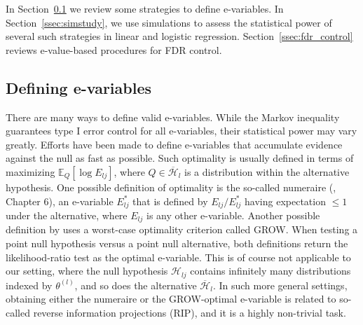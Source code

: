 \documentclass[pdflatex,sn-mathphys-num]{sn-jnl}%
\theoremstyle{thmstyleone}%
\theoremstyle{thmstyletwo}%
\theoremstyle{thmstylethree}%
\begin{document}
In Section~\ref{ssec:define_evariables} we review some strategies to define e-variables. 
In Section~\ref{ssec:simstudy}, we use simulations to assess the statistical power of several such strategies in linear and logistic regression. Section~\ref{ssec:fdr_control} reviews e-value-based procedures for FDR control.


\subsection{Defining e-variables}
\label{ssec:define_evariables}

There are many ways to define valid e-variables. While the Markov inequality guarantees type I error control for all e-variables, their statistical power may vary greatly. Efforts have been made to define e-variables that accumulate evidence against the null as fast as possible. Such optimality is usually defined in terms of maximizing $\mathbb E_Q [\log E_{lj}]$, where $Q \in \overline{\mathcal{H}}_l$ is a distribution within the alternative hypothesis. 
One possible definition of optimality is the so-called numeraire (\cite{ramdas:2025}, Chapter 6), an e-variable $E_{lj}^*$ that is defined by $E_{lj}/E_{lj}^*$ having expectation $\leq 1$ under the alternative, where $E_{lj}$ is any other e-variable. 
Another possible definition by \cite{gruenwald:2024} uses a worst-case optimality criterion called GROW.
When testing a point null hypothesis versus a point null alternative, both definitions return the likelihood-ratio test as the optimal e-variable. This is of course not applicable to our setting, where the null hypothesis $\mathcal{H}_{lj}$ contains infinitely many distributions indexed by $\theta^{(l)}$, and so does the alternative $\overline{\mathcal{H}}_l$.
In such more general settings, obtaining either the numeraire or the GROW-optimal e-variable is related to so-called reverse information projections (RIP), and it is a highly non-trivial task.
\end{document}

